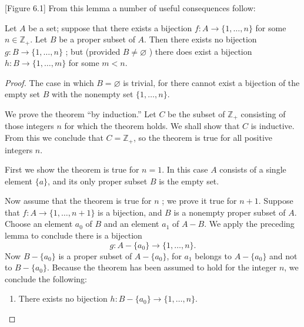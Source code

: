 [Figure 6.1]
From this lemma a number of useful consequences follow:

\begin{theorem}
\label{thm:\thetheorem}
 Let \(A\) be a set; suppose that there exists a bijection \(f : A \rightarrow \{1,\ldots, n\}\) for some \(n \in {\mathbb{Z}}_{+}\). Let \(B\) be a proper subset of \(A\). Then there exists no bijection \(g : B \rightarrow \{1,\ldots, n\}\) ; but (provided \(B \neq \varnothing\) ) there does exist a bijection \(h : B \rightarrow \{1,\ldots, m\}\) for some \(m < n\).
\end{theorem}

\begin{proof}
 The case in which \(B = \varnothing\) is trivial, for there cannot exist a bijection of the empty set \(B\) with the nonempty set \(\{1,\ldots, n\}\).

 We prove the theorem ``by induction.'' Let \(C\) be the subset of \(\mathbb{Z}_{+}\) consisting of those integers \(n\) for which the theorem holds. We shall show that \(C\) is inductive. From this we conclude that \(C = \mathbb{Z}_{+}\), so the theorem is true for all positive integers \(n\).

 First we show the theorem is true for \(n = 1\). In this case \(A\) consists of a single element \(\{ a\}\), and its only proper subset \(B\) is the empty set.

 Now assume that the theorem is true for \(n\) ; we prove it true for \(n + 1\). Suppose that \(f : A \rightarrow \{1,\ldots, n + 1\}\) is a bijection, and \(B\) is a nonempty proper subset of \(A\). Choose an element \(a_{0}\) of \(B\) and an element \(a_{1}\) of \(A - B\). We apply the preceding lemma to conclude there is a bijection
 \[
 g : A - \{ a_{0}\} \rightarrow \{1,\ldots, n\}.
 \]
 Now \(B - \{ a_{0}\}\) is a proper subset of \(A - \{ a_{0}\}\), for \(a_{1}\) belongs to \(A - \{ a_{0}\}\) and not to \(B - \{ a_{0}\}\). Because the theorem has been assumed to hold for the integer \(n\), we conclude the following:

 \begin{enumerate}[itemsep=0.2em, parsep=0pt, topsep=0pt, partopsep=0pt, leftmargin=*, label=(\arabic*), align=left]
 \item There exists no bijection \(h : B - \{ a_{0}\} \rightarrow \{1,\ldots, n\}\).


\end{enumerate}
\end{proof}
